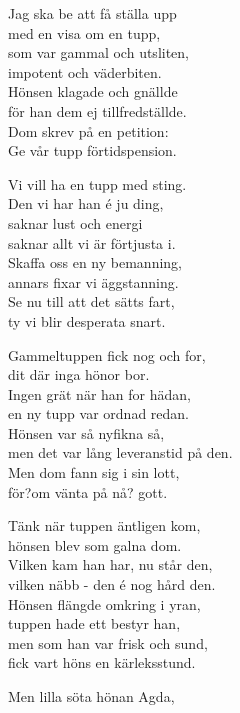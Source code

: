 \vspace{10pt}
Jag ska be att få ställa upp\\
med en visa om en tupp,\\
som var gammal och utsliten,\\
impotent och väderbiten.\\
Hönsen klagade och gnällde\\
för han dem ej tillfredställde.\\
Dom skrev på en petition:\\
Ge vår tupp förtidspension.\par
\vspace{10pt}
Vi vill ha en tupp med sting.\\
Den vi har han é ju ding,\\
saknar lust och energi\\
saknar allt vi är förtjusta i.\\
Skaffa oss en ny bemanning,\\
annars fixar vi äggstanning.\\
Se nu till att det sätts fart,\\
ty vi blir desperata snart.\par
\vspace{10pt}
Gammeltuppen fick nog och for,\\
dit där inga hönor bor.\\
Ingen grät när han for hädan,\\
en ny tupp var ordnad redan.\\
Hönsen var så nyfikna så,\\
men det var lång leveranstid på den.\\
Men dom fann sig i sin lott,\\
för?om vänta på nå? gott.\par
\vspace{10pt}
Tänk när tuppen äntligen kom,\\
hönsen blev som galna dom.\\
Vilken kam han har, nu står den,\\
vilken näbb - den é nog hård den.\\
Hönsen flängde omkring i yran,\\
tuppen hade ett bestyr han,\\
men som han var frisk och sund,\\
fick vart höns en kärleksstund.\par
\vspace{10pt}
Men lilla söta hönan Agda,\\
